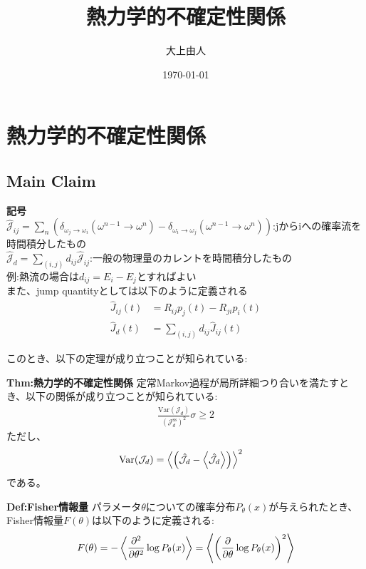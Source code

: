 \documentclass[a4paper,11pt]{jsarticle}
\numberwithin{equation}{section}
\begin{document}
\title{熱力学的不確定性関係}
\author{大上由人}
\date{\today}
\maketitle

\section{熱力学的不確定性関係}
\subsection{Main Claim}
\textbf{記号}\\
$\hat{\mathcal{J}}_{ij} = \sum_{n} (\delta_{\omega_j \to \omega_i}(\omega^{n-1}\to \omega^n) - \delta_{\omega_i \to \omega_j}(\omega^{n-1}\to \omega^n))$:jからiへの確率流を時間積分したもの\\
$\hat{\mathcal{J}}_{d} = \sum_{(i,j)} d_{ij} \hat{\mathcal{J}}_{ij}$:一般の物理量のカレントを時間積分したもの\\

例:熱流の場合は$d_{ij} = E_i - E_j$とすればよい\\

また、jump quantityとしては以下のように定義される\\
\begin{align}
    \hat{J}_{ij}(t) &= R_{ij}p_j(t) - R_{ji}p_i(t)\\
    \hat{J}_{d}(t) &= \sum_{(i,j)} d_{ij} \hat{J}_{ij}(t)
\end{align}

このとき、以下の定理が成り立つことが知られている:

\begin{itembox}[l]{\textbf{Thm:熱力学的不確定性関係}}
    定常Markov過程が局所詳細つり合いを満たすとき、以下の関係が成り立つことが知られている:
    \begin{align}
        \frac{\text{Var}(\mathcal{J}_d)}{(\mathcal{J}_d^{\text{ss}})^2} \sigma \geq 2
    \end{align}
    ただし、
    \begin{align}
        \text{Var}(\mathcal{J}_d) &= \ev{\qty(\hat{\mathcal{J}}_d -\ev{\hat{\mathcal{J}_d}})}^2
    \end{align}
    である。
\end{itembox}


\begin{itembox}[l]{\textbf{Def:Fisher情報量}}
    パラメータ$\theta$についての確率分布$P_{\theta}(x)$が与えられたとき、Fisher情報量$F(\theta)$は以下のように定義される:
    \begin{align}
        F(\theta) = -\ev{\pdv[2]{\theta} \log P_{\theta}(x)} =\ev{\qty(\pdv{\theta} \log P_{\theta}(x))^2}
    \end{align}
\end{itembox}
\end{document}
